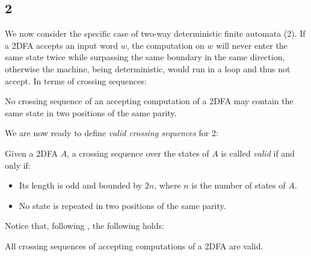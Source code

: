 \subsection{2\DFAs}
We now consider the specific case of two-way deterministic finite automata (2\DFAs).
If a 2DFA accepts an input word $w$, the computation on $w$ will never enter the same state twice while surpassing the same boundary in the same direction, otherwise the machine, being deterministic, would run in a loop and thus not accept.
In terms of crossing sequences:
\begin{fact}\label{fact:crossing-2DFA-parity}
	No crossing sequence of an accepting computation of a 2DFA may contain the same state in two positions of the same parity.
\end{fact}

We are now ready to define \emph{valid crossing sequences} for 2\DFAs:
\begin{defn}
	Given a 2DFA $A$, a crossing sequence over the states of $A$ is called \emph{valid} if and only if:
	\begin{itemize}
		\item Its length is odd and bounded by $2n$, where $n$ is the number of states of $A$.
		\item No state is repeated in two positions of the same parity.
	\end{itemize}
\end{defn}

Notice that, following , the following holds:
\begin{fact}
	All crossing sequences of accepting computations of a 2DFA are valid.
\end{fact}

